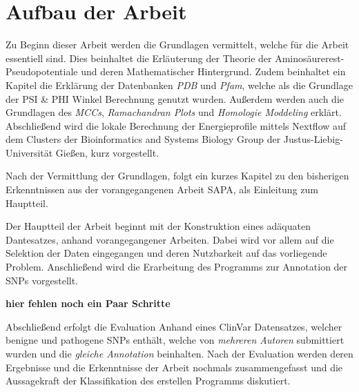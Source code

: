 \section{Aufbau der Arbeit}

Zu Beginn dieser Arbeit werden die Grundlagen vermittelt, welche für die Arbeit essentiell sind. Dies beinhaltet die Erläuterung der Theorie der Aminosäurerest-Pseudopotentiale und deren Mathematischer Hintergrund. Zudem beinhaltet ein Kapitel die Erklärung der Datenbanken \emph{PDB} und \emph{Pfam}, welche als die Grundlage der PSI \& PHI Winkel Berechnung genutzt wurden. Außerdem werden auch die Grundlagen des \emph{MCCs}, \emph{Ramachandran Plots} und \emph{Homologie Moddeling} 
erklärt. Abschließend wird die lokale Berechnung der Energieprofile mittels Nextflow auf dem Clusters der Bioinformatics and Systems Biology Group der Justus-Liebig-Universität Gießen, kurz vorgestellt.

Nach der Vermittlung der Grundlagen, folgt ein kurzes Kapitel zu den bisherigen Erkenntnissen aus der vorangegangenen Arbeit SAPA, als Einleitung zum Hauptteil.

Der Hauptteil der Arbeit beginnt mit der Konstruktion eines adäquaten Dantesatzes, anhand vorangegangener Arbeiten. Dabei wird vor allem auf die Selektion der Daten eingegangen und deren Nutzbarkeit auf das vorliegende Problem. Anschließend wird die Erarbeitung des Programms zur Annotation der SNPs vorgestellt.

\textbf{hier fehlen noch ein Paar Schritte}

Abschließend erfolgt die Evaluation Anhand eines ClinVar Datensatzes, welcher benigne und pathogene SNPs enthält, welche von \emph{mehreren Autoren} submittiert wurden und die \emph{gleiche Annotation} beinhalten. Nach der Evaluation werden deren Ergebnisse und die Erkenntnisse der Arbeit nochmals zusammengefasst und die Aussagekraft der Klassifikation des erstellen Programms diskutiert.



